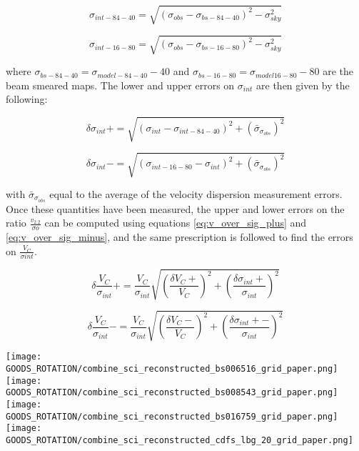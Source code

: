 \documentclass[fleqn,usenatbib]{mn2e}
\begin{document}
\begin{equation}\label{eq:sig_84_40}
   \sigma_{int-84-40} = \sqrt{(\sigma_{obs} - \sigma_{bs-84-40})^{2} - \sigma_{sky}^{2}}
\end{equation}

\begin{equation}\label{eq:sig_16_80}
   \sigma_{int-16-80} = \sqrt{\left(\sigma_{obs} - \sigma_{bs-16-80}\right)^{2} - \sigma_{sky}^{2}}
\end{equation}

where $\sigma_{bs-84-40} = \sigma_{model-84-40} - 40$ and $\sigma_{bs-16-80} = \sigma_{model16-80} - 80$ are the beam smeared maps.
The lower and upper errors on $\sigma_{int}$ are then given by the following:

\begin{equation}\label{eq:sig_plus_error}
   \delta\sigma_{int}+ = \sqrt{\left(\sigma_{int} - \sigma_{int-84-40}\right)^{2} + \left(\bar{\sigma}_{\sigma_{obs}}\right)^{2}}
\end{equation}

\begin{equation}\label{eq:sig_minus_error}
   \delta\sigma_{int}- = \sqrt{\left(\sigma_{int-16-80} - \sigma_{int}\right)^{2} + \left(\bar{\sigma}_{\sigma_{obs}}\right)^{2}}
\end{equation}

with $\bar{\sigma}_{\sigma_{obs}}$ equal to the average of the velocity dispersion measurement errors.
Once these quantities have been measured, the upper and lower errors on the ratio $\frac{v_{2.2}}{\sigma{o}}$ can be computed using equations \ref{eq:v_over_sig_plus} and \ref{eq:v_over_sig_minus}, and the same prescription is followed to find the errors on $\frac{V_{C}}{\sigma{int}}$.

\begin{equation}\label{eq:v_over_sig_plus}
   \delta\frac{V_{C}}{\sigma_{int}}+ = \frac{V_{C}}{\sigma_{int}}\sqrt{\left(\frac{\delta V_{C}+}{V_{C}}\right)^{2} + \left(\frac{\delta\sigma_{int}+}{\sigma_{int}}\right)^{2}}
\end{equation}

\begin{equation}\label{eq:v_over_sig_minus}
   \delta\frac{V_{C}}{\sigma_{int}}- = \frac{V_{C}}{\sigma_{int}}\sqrt{\left(\frac{\delta V_{C}-}{V_{C}}\right)^{2} + \left(\frac{\delta\sigma_{int}+-}{\sigma_{int}}\right)^{2}}
\end{equation}

\begin{figure*}
    \centering

    \texttt{[image: GOODS\_ROTATION/combine\_sci\_reconstructed\_bs006516\_grid\_paper.png]}
    \texttt{[image: GOODS\_ROTATION/combine\_sci\_reconstructed\_bs008543\_grid\_paper.png]}
    \texttt{[image: GOODS\_ROTATION/combine\_sci\_reconstructed\_bs016759\_grid\_paper.png]}
    \texttt{[image: GOODS\_ROTATION/combine\_sci\_reconstructed\_cdfs\_lbg\_20\_grid\_paper.png]}


\end{figure*}
\end{document}
